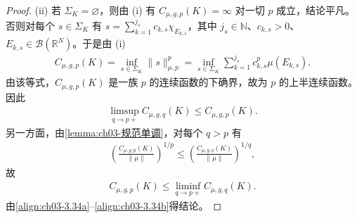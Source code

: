 \documentclass[../../main.tex]{subfiles}%
\begin{document}
\begin{proof}
(ii) 若 $\Sigma_K=\varnothing$，则由 (i) 有 $C_{\mu,g,p}(K)=\infty$ 对一切 $p$ 成立，结论平凡。否则对每个 $s\in\Sigma_K$ 有 $s=\sum_{k=1}^{j_s}c_{k,s}\chi_{E_{k,s}}$，其中 $j_s\in\mathbb{N}$、$c_{k,s}>0$、$E_{k,s}\in\mathcal{B}(\mathbb{R}^N)$。于是由 (i)
\begin{align*}
C_{\mu,g,p}(K)=\inf_{s\in\Sigma_K}\|s\|_{\mu,p}^p=\inf_{s\in\Sigma_K}\sum_{k=1}^{j_s}c_{k,s}^p\mu(E_{k,s}).
\end{align*}
由该等式，$C_{\mu,g,p}(K)$ 是一族 $p$ 的连续函数的下确界，故为 $p$ 的上半连续函数。因此
\begin{align}
\limsup_{q\to p+}C_{\mu,g,q}(K)\leqslant C_{\mu,g,p}(K).\label{align:ch03-3.34a}
\end{align}
另一方面，由\cref{lemma:ch03-规范单调}，对每个 $q>p$ 有
\begin{align*}
\left(\frac{C_{\mu,g,p}(K)}{\|\mu\|}\right)^{1/p}\leqslant\left(\frac{C_{\mu,g,q}(K)}{\|\mu\|}\right)^{1/q},
\end{align*}
故
\begin{align}
C_{\mu,g,p}(K)\leqslant\liminf_{q\to p+}C_{\mu,g,q}(K).\label{align:ch03-3.34b}
\end{align}
由\eqref{align:ch03-3.34a}--\eqref{align:ch03-3.34b}得结论。
\end{proof}
\end{document}
